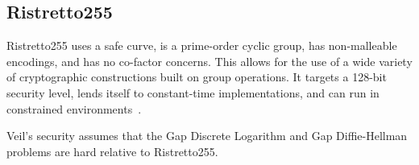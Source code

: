 \subsection{Ristretto255}\label{subsec:ristretto255}

Ristretto255 uses a safe curve, is a prime-order cyclic group, has non-malleable encodings, and has no
co-factor concerns.
This allows for the use of a wide variety of cryptographic constructions built on group operations.
It targets a 128-bit security level, lends itself to constant-time implementations, and can run in constrained
environments~\cite{deValence2018}.

Veil's security assumes that the Gap Discrete Logarithm and Gap Diffie-Hellman problems are hard relative to
Ristretto255.
